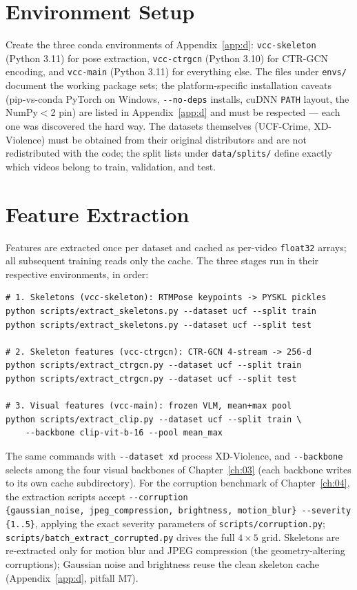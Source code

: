 \section{Environment Setup}
\label{sec:appe-envs}

Create the three conda environments of Appendix~\ref{app:d}:
\texttt{vcc-skeleton} (Python 3.11) for pose extraction, \texttt{vcc-ctrgcn}
(Python 3.10) for CTR-GCN encoding, and \texttt{vcc-main} (Python 3.11) for
everything else. The files under \texttt{envs/} document the working package
sets; the platform-specific installation caveats (pip-vs-conda PyTorch on
Windows, \texttt{-{}-no-deps} installs, cuDNN \texttt{PATH} layout, the
NumPy$<$2 pin) are listed in Appendix~\ref{app:d} and must be respected ---
each one was discovered the hard way. The datasets themselves (UCF-Crime,
XD-Violence) must be obtained from their original distributors and are not
redistributed with the code; the split lists under \texttt{data/splits/}
define exactly which videos belong to train, validation, and test.

\section{Feature Extraction}
\label{sec:appe-extract}

Features are extracted once per dataset and cached as per-video
\texttt{float32} arrays; all subsequent training reads only the cache. The
three stages run in their respective environments, in order:

\begin{verbatim}
# 1. Skeletons (vcc-skeleton): RTMPose keypoints -> PYSKL pickles
python scripts/extract_skeletons.py --dataset ucf --split train
python scripts/extract_skeletons.py --dataset ucf --split test

# 2. Skeleton features (vcc-ctrgcn): CTR-GCN 4-stream -> 256-d
python scripts/extract_ctrgcn.py --dataset ucf --split train
python scripts/extract_ctrgcn.py --dataset ucf --split test

# 3. Visual features (vcc-main): frozen VLM, mean+max pool
python scripts/extract_clip.py --dataset ucf --split train \
    --backbone clip-vit-b-16 --pool mean_max
\end{verbatim}

The same commands with \texttt{-{}-dataset xd} process XD-Violence, and
\texttt{-{}-backbone} selects among the four visual backbones of
Chapter~\ref{ch:03} (each backbone writes to its own cache subdirectory). For
the corruption benchmark of Chapter~\ref{ch:04}, the extraction scripts accept
\texttt{-{}-corruption \{gaussian\_noise,\allowbreak\ jpeg\_compression,\allowbreak\
brightness,\allowbreak\ motion\_blur\}\allowbreak\ -{}-severity \{1..5\}}, applying the exact severity parameters
of \texttt{scripts/corruption.py}; \texttt{scripts/batch\_extract\_corrupted.py}
drives the full $4\times5$ grid. Skeletons are re-extracted only for motion
blur and JPEG compression (the geometry-altering corruptions); Gaussian noise
and brightness reuse the clean skeleton cache (Appendix~\ref{app:d}, pitfall
M7).


